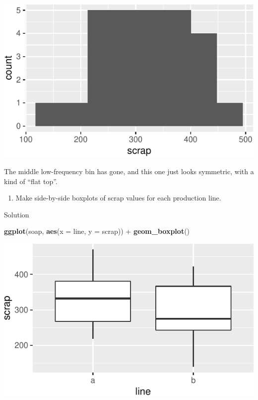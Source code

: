 \documentclass[]{tufte-book}
\newenvironment{Shaded}{}{}
\newcommand{\DataTypeTok}[1]{\textcolor[rgb]{0.56,0.13,0.00}{#1}}
\newcommand{\KeywordTok}[1]{\textcolor[rgb]{0.00,0.44,0.13}{\textbf{#1}}}
\newcommand{\NormalTok}[1]{#1}
\newcommand{\OperatorTok}[1]{\textcolor[rgb]{0.40,0.40,0.40}{#1}}
\newcommand{\StringTok}[1]{\textcolor[rgb]{0.25,0.44,0.63}{#1}}
\providecommand{\tightlist}{%
  \setlength{\itemsep}{0pt}\setlength{\parskip}{0pt}}
\theoremstyle{definition}
\theoremstyle{definition}
\theoremstyle{definition}
\theoremstyle{remark}
\begin{document}
\includegraphics{02-reading-in_files/figure-latex/unnamed-chunk-12-1}

The middle low-frequency bin has gone, and this one just looks
symmetric, with a kind of ``flat top''.

\begin{enumerate}
\def\labelenumi{(\alph{enumi})}
\setcounter{enumi}{3}
\tightlist
\item
  Make side-by-side boxplots of scrap values for each production line.
\end{enumerate}

Solution

\begin{Shaded}
\begin{Highlighting}[]
\KeywordTok{ggplot}\NormalTok{(soap, }\KeywordTok{aes}\NormalTok{(}\DataTypeTok{x =}\NormalTok{ line, }\DataTypeTok{y =}\NormalTok{ scrap)) }\OperatorTok{+}\StringTok{ }\KeywordTok{geom_boxplot}\NormalTok{()}
\end{Highlighting}
\end{Shaded}

\includegraphics{02-reading-in_files/figure-latex/unnamed-chunk-13-1}
\end{document}
